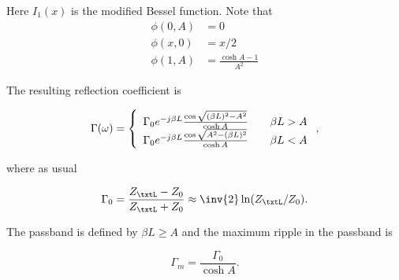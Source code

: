 Here \( I_1(x) \) is the modified Bessel function.  Note that
\begin{equation}\label{eqn:continuumAndOtherTransformersCore:1060}
\begin{aligned}
\phi(0, A) &= 0 \\
\phi(x, 0) &= x/2 \\
\phi(1, A) &= \frac{\cosh A - 1}{A^2}
\end{aligned}
\end{equation}

The resulting reflection coefficient is

\begin{equation}\label{eqn:continuumAndOtherTransformersCore:1080}
\Gamma(\omega)
=
\left\{
\begin{array}{l l}
\Gamma_0 e^{-j \beta L} \frac{\cos\sqrt{(\beta L)^2 - A^2}}{\cosh A} & \quad \mbox{\( \beta L > A \)} \\
\Gamma_0 e^{-j \beta L} \frac{\cos\sqrt{A^2 - (\beta L)^2 }}{\cosh A} & \quad \mbox{\( \beta L < A \)} \\
\end{array}
\right.,
\end{equation}

where as usual

\begin{equation}\label{eqn:continuumAndOtherTransformersCore:1100}
\Gamma_0 = \frac{Z_\txtL - Z_0}{Z_\txtL + Z_0} \approx \inv{2} \ln (Z_\txtL/Z_0).
\end{equation}

The passband is defined by \( \beta L \ge A \) and the maximum ripple in the passband is

\begin{equation}\label{eqn:continuumAndOtherTransformersCore:1120}
\Gamma_m = \frac{\Gamma_0}{\cosh A}.
\end{equation}

